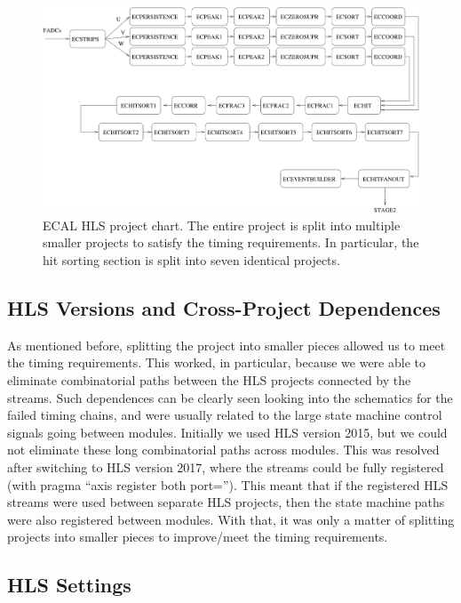\begin{figure}[hbt]
	\centering
	\includegraphics[width=1.0\columnwidth,keepaspectratio]{img/hls_chart.png}
	\caption{ECAL HLS project chart. The entire project is split into multiple smaller projects to satisfy the timing requirements. In particular, the hit sorting section is split into seven identical projects.}
	\label{fig:hls_chart}
\end{figure}


\subsection{HLS Versions and Cross-Project Dependences}

As mentioned before, splitting the project into smaller pieces allowed us to meet the timing requirements. This worked, in particular, because we were able to eliminate combinatorial paths between the HLS projects connected by the streams. Such dependences can be clearly seen looking into the schematics for the failed timing chains, and were usually related to the large state machine control signals going between modules. Initially we used HLS version 2015, but we could not eliminate these long combinatorial paths across modules. This was resolved after switching to HLS version 2017, where the streams could be fully registered (with pragma ``axis register both port=''). This meant that if the registered HLS streams were used between separate HLS projects, then the state machine paths were also registered between modules. With that, it was only a matter of splitting projects into smaller pieces to improve/meet the timing requirements.


\subsection{HLS Settings}

